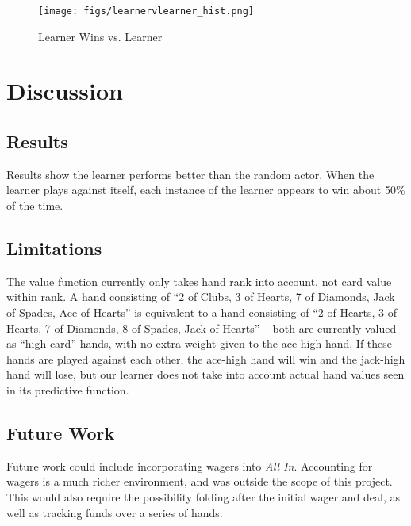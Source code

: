 \documentclass[12pt,pdftex]{article}
\begin{document}
\begin{figure}[ht!]
	\begin{center}
		\texttt{[image: figs/learnervlearner\_hist.png]}
		\caption{Learner Wins vs. Learner}
		\label{fig:learn_v_learn_hist}
\end{center}
\end{figure}


\section{Discussion} \label{sec:disc}
\subsection{Results}
Results show the learner performs better than the random actor. 
When the learner plays against itself, each instance of the learner appears to win about 50\% of the time.

\subsection{Limitations}
\label{subsec:limit}
The value function currently only takes hand rank into account, not card value within rank. A hand consisting of ``2 of Clubs, 3 of Hearts, 7 of Diamonds, Jack of Spades, Ace of Hearts'' is equivalent to a hand consisting of ``2 of Hearts, 3 of Hearts, 7 of Diamonds, 8 of Spades, Jack of Hearts'' -- both are currently valued as ``high card'' hands, with no extra weight given to the ace-high hand. 
If these hands are played against each other, the ace-high hand will win and the jack-high hand will lose, but our learner does not take into account actual hand values seen in its predictive function.

\subsection{Future Work}
Future work could include incorporating wagers into \emph{All In}.  
Accounting for wagers is a much richer environment, and was outside the scope of this project.  
This would also require the possibility folding after the initial wager and deal, as well as tracking funds over a series of hands.
\end{document}
